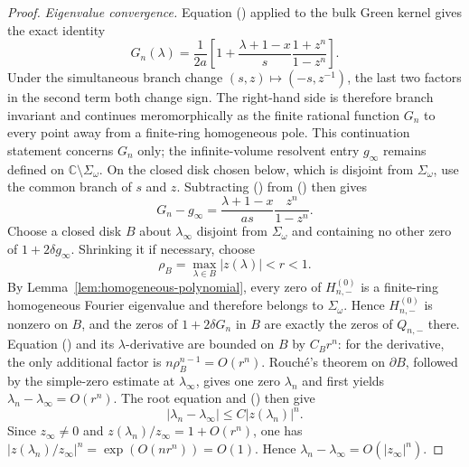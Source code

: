 \documentclass[twoside,10pt]{article}
\numberwithin{equation}{section}
\theoremstyle{slbody}
\theoremstyle{definition}
\theoremstyle{remark}
\renewcommand{\eqref}[1]{%
  \textup{{\normalfont(\oldstylenums{\ref{#1}}}\normalfont)}}
\begin{document}
\begin{proof}
\emph{Eigenvalue convergence.}
Equation \eqref{eq:green-root-unity} applied to the bulk Green kernel
gives the exact identity
\begin{equation}\label{eq:finite-green-z}
 G_n(\lambda)=\frac1{2a}\left[1+
  \frac{\lambda+1-x}{s}\frac{1+z^n}{1-z^n}\right].
\end{equation}
Under the simultaneous branch change $(s,z)\mapsto(-s,z^{-1})$, the
last two factors in the second term both change sign.  The right-hand
side is therefore branch invariant and continues meromorphically as
the finite rational function $G_n$ to every point away from a
finite-ring homogeneous pole.  This continuation statement concerns
$G_n$ only; the infinite-volume resolvent entry $g_\infty$ remains
defined on $\mathbb C\setminus\Sigma_\omega$.  On the closed disk chosen
below, which is disjoint from $\Sigma_\omega$, use the common branch of
$s$ and $z$.  Subtracting \eqref{eq:localization-green} from
\eqref{eq:finite-green-z} then gives
\begin{equation}\label{eq:finite-green-error}
 G_n-g_\infty=
 \frac{\lambda+1-x}{as}\frac{z^n}{1-z^n}.
\end{equation}
Choose a closed disk $B$ about $\lambda_\infty$ disjoint from
$\Sigma_\omega$ and containing no other zero of
$1+2\delta g_\infty$.  Shrinking it if necessary, choose
\[
 \rho_B=\max_{\lambda\in B}|z(\lambda)|<r<1.
\]
By Lemma~\ref{lem:homogeneous-polynomial}, every zero of
$H_{n,-}^{(0)}$ is a finite-ring homogeneous Fourier eigenvalue and
therefore belongs to $\Sigma_\omega$.  Hence $H_{n,-}^{(0)}$ is
nonzero on $B$, and the zeros of $1+2\delta G_n$ in $B$ are exactly
the zeros of $Q_{n,-}$ there.
Equation
\eqref{eq:finite-green-error} and its $\lambda$-derivative are bounded
on $B$ by $C_Br^n$: for the derivative, the only additional factor is
$n\rho_B^{n-1}=O(r^n)$.  Rouch\'e's theorem on $\partial B$, followed by
the simple-zero estimate at $\lambda_\infty$, gives one zero
$\lambda_n$ and first yields
$\lambda_n-\lambda_\infty=O(r^n)$.  The root equation and
\eqref{eq:finite-green-error} then give
\[
 |\lambda_n-\lambda_\infty|
 \le C|z(\lambda_n)|^n.
\]
Since $z_\infty\ne0$ and
$z(\lambda_n)/z_\infty=1+O(r^n)$, one has
$|z(\lambda_n)/z_\infty|^n=\exp(O(nr^n))=O(1)$.  Hence
$\lambda_n-\lambda_\infty=O(|z_\infty|^n)$.


\end{proof}
\end{document}
